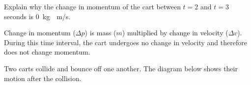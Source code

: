 \documentclass[answers]{exam}
\begin{document}
\begin{questions}
Explain why the change in momentum of the cart between $t = 2$ and $t = 3$ seconds is \SI{0}{\kg\cdot m/s}.

\ifprintanswers
\else
\fillwithlines{2cm}
\fi

\begin{solution}
Change in momentum ($\Delta p$) is mass ($m$) multiplied by change in velocity ($\Delta v$). During this time interval, the cart undergoes no change in velocity and therefore does not change momentum.
\end{solution}








\question
Two carts collide and bounce off one another. The diagram below shows their motion after the collision.


\begin{center}
\end{center}


\end{questions}
\end{document}
